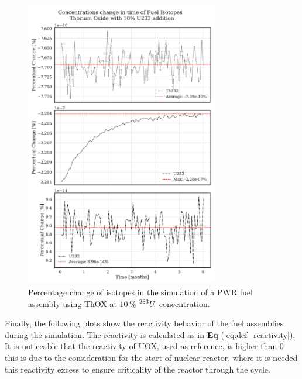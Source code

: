 \begin{figure}[h]
    \centering
    \includegraphics[width=0.75\textwidth, height=0.75\textheight]{Kap7/Figures_Kap7/percentual_change_th232_U233_10.pdf}
    \caption{Percentage change of isotopes in the simulation of a PWR fuel assembly using ThOX at \(10 \, \%\) \(\prescript{233}{}{U}\) concentration.}
    \label{fig:th_u233_10}
\end{figure}


Finally, the following plots show the reactivity behavior of the fuel assemblies during the simulation. The reactivity is calculated as in \textbf{Eq} (\ref{eq:def_reactivity}). It is noticeable that the reactivity of UOX, used as reference, is higher than \(0\) this is due to the consideration for the start of nuclear reactor, where it is needed this reactivity excess to ensure criticality of the reactor through the cycle.

